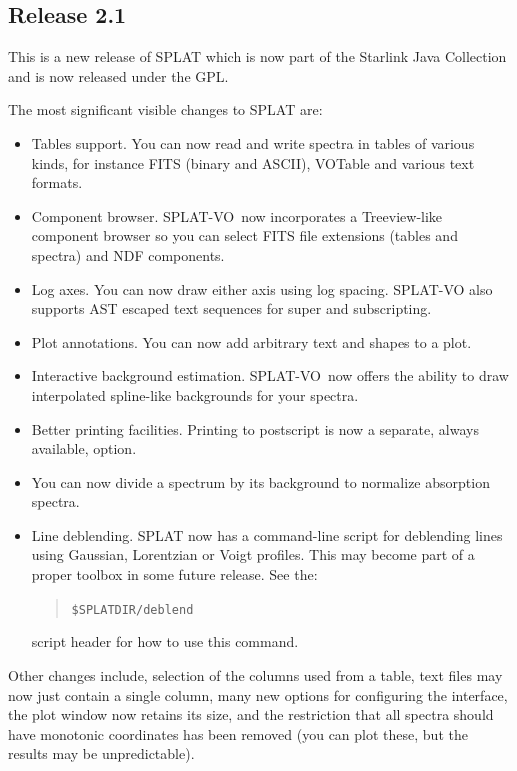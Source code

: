 \documentclass[twoside,11pt]{article}
\renewcommand{\_}{\texttt{\symbol{95}}}
\newcommand{\SPLAT}{\textsf{SPLAT-VO}}
\newcommand{\hitext}[1]{\texttt{#1}}
\begin{document}
\subsection{Release 2.1}

This is a new release of SPLAT which is now part of the Starlink
Java Collection and is now released under the GPL.

The most significant visible changes to SPLAT are:
\begin{itemize}
    \item Tables support. You can now read and write spectra in tables of
    various kinds, for instance FITS (binary and ASCII), VOTable and various
    text formats.

    \item Component browser. \SPLAT\ now incorporates a Treeview-like
    component browser so you can select FITS file extensions (tables and
    spectra) and NDF components.

    \item Log axes. You can now draw either axis using log spacing. \SPLAT
    also supports AST escaped text sequences for super and subscripting.

    \item Plot annotations. You can now add arbitrary text and shapes to a
    plot.

    \item Interactive background estimation. \SPLAT\ now offers the ability to
    draw interpolated spline-like backgrounds for your spectra.

    \item Better printing facilities. Printing to postscript is now a separate,
    always available, option.

    \item You can now divide a spectrum by its background to normalize
    absorption spectra.

    \item Line deblending. SPLAT now has a command-line script for deblending
    lines using Gaussian, Lorentzian or Voigt profiles. This may become part
    of a proper toolbox in some future release. See the:
    \begin{quote}
       \hitext{\$SPLAT\_DIR/deblend}
    \end{quote}
    script header for how to use this command.

\end{itemize}
Other changes include, selection of the columns used from a table, text files
may now just contain a single column, many new options for configuring the
interface, the plot window now retains its size, and the restriction that all
spectra should have monotonic coordinates has been removed (you can plot
these, but the results may be unpredictable).
\end{document}

